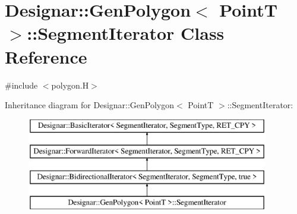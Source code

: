 \hypertarget{class_designar_1_1_gen_polygon_1_1_segment_iterator}{}\section{Designar\+:\+:Gen\+Polygon$<$ PointT $>$\+:\+:Segment\+Iterator Class Reference}
\label{class_designar_1_1_gen_polygon_1_1_segment_iterator}


{\ttfamily \#include $<$polygon.\+H$>$}

Inheritance diagram for Designar\+:\+:Gen\+Polygon$<$ PointT $>$\+:\+:Segment\+Iterator\+:\begin{figure}[H]
\begin{center}
\leavevmode
\includegraphics[height=4.000000cm]{class_designar_1_1_gen_polygon_1_1_segment_iterator}
\end{center}
\end{figure}
